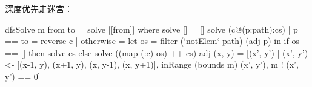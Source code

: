 \documentclass[b5paper]{ctexart}
\begin{document}






深度优先走迷宫：

\begin{Haskell}
dfsSolve m from to = solve [[from]] where
  solve [] = []
  solve (c@(p:path):cs)
      | p == to = reverse c
      | otherwise = let os = filter (`notElem` path) (adj p) in
                      if os == [] then solve cs
                      else solve ((map (:c) os) ++ cs)
  adj (x, y) = [(x', y') | (x', y') <- [(x-1, y), (x+1, y), (x, y-1), (x, y+1)],
                           inRange (bounds m) (x', y'), m ! (x', y') == 0]
\end{Haskell}
\end{document}
